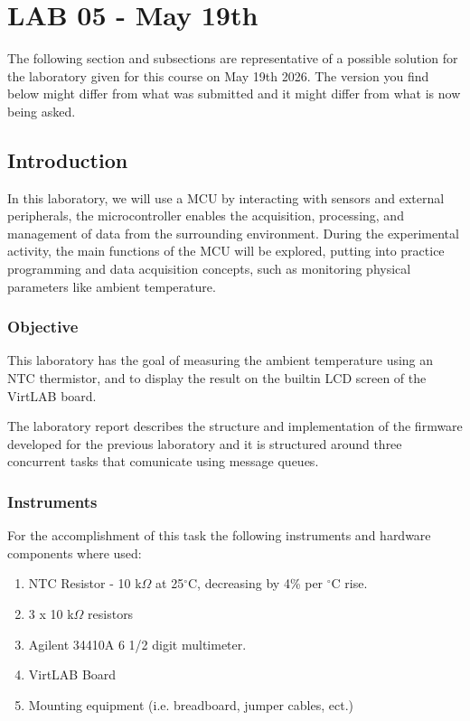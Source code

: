 \documentclass[../main.tex]{subfiles}
\begin{document}
\clearpage
\thispagestyle{empty}
\vspace*{7cm}
\section{LAB 05 - May 19th}
\vspace*{1.5cm}


The following section and subsections are representative of a possible solution for the laboratory given for this course on May 19th 2026.
The version you find below might differ from what was submitted and it might differ from what is now being asked. 


\vspace*{1cm}
\subsection{Introduction}

In this laboratory, we will use a MCU by interacting with sensors and external peripherals, the microcontroller enables the acquisition, processing, and management of data from the surrounding environment. 
During the experimental activity, the main functions of the MCU will be explored, putting into practice programming and data acquisition concepts, such as monitoring physical parameters like ambient temperature.

\subsubsection*{Objective}

This laboratory has the goal of measuring the ambient temperature using an NTC thermistor, and to display the result on the builtin LCD screen of the VirtLAB board.

The laboratory report describes the structure and implementation of the firmware developed for the previous laboratory and it is structured around three concurrent tasks that comunicate using message queues.


\subsubsection*{Instruments} 

For the accomplishment of this task the following instruments and hardware components where used:

\begin{enumerate}[label=\textbf{-}]
	\item NTC Resistor - 10 k$\Omega$ at 25$^\circ$C, decreasing by 4\% per $^\circ$C rise.
	\item 3 x 10 k$\Omega$ resistors
	\item Agilent 34410A 6 1/2 digit multimeter.
	\item VirtLAB Board
	\item Mounting equipment (i.e. breadboard, jumper cables, ect.)
\end{enumerate}
\end{document}
